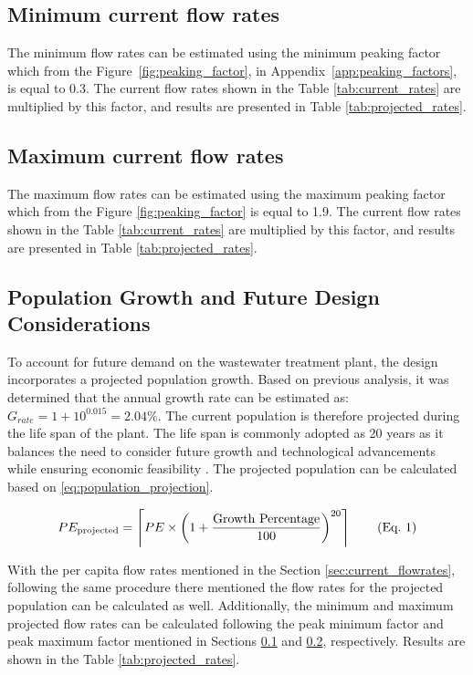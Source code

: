 \documentclass[11pt]{article}
\begin{document}
\subsection{Minimum current flow rates}
\label{sec:minimum_current_flowrates}

The minimum flow rates can be estimated using the minimum peaking factor
which from the Figure~\ref{fig:peaking_factor}, in Appendix~\ref{app:peaking_factors},
 is equal to 0.3. The current flow rates shown in the Table \ref{tab:current_rates}
are multiplied by this factor, and results are presented in Table \ref{tab:projected_rates}.


\subsection{Maximum current flow rates}
\label{sec:maximum_current_flowrates}

The maximum flow rates can be estimated using the maximum peaking factor
which from the Figure \ref{fig:peaking_factor} is equal to 1.9. The current flow rates shown in the Table \ref{tab:current_rates}
are multiplied by this factor, and results are presented in Table \ref{tab:projected_rates}.

\subsection{Population Growth and Future Design Considerations}

To account for future demand on the wastewater treatment plant, the design incorporates a projected population 
growth. Based on previous analysis, it was determined that 
the annual growth rate can be estimated as: \(G_{rate} = 1 + 10^{0.015} =2.04\%\).
The current population is therefore projected during the life span of the plant. The life span is 
commonly adopted as 20 years as it balances the need to consider future growth and 
technological advancements while ensuring economic feasibility \cite{wef_DesignWaterResource}.
The projected population can be calculated based on \eqref{eq:population_projection}. 


\begin{align}
  \refstepcounter{equation}
  PE_{\text{projected}} = \left\lceil PE \times \left(1 + \frac{\text{Growth Percentage}}{100} \right)^{20} \right\rceil 
  \tag{Eq.~\theequation} \label{eq:population_projection}
\end{align}

With the per capita flow rates mentioned in the Section \ref{sec:current_flowrates}, following the same procedure there mentioned
the flow rates for the projected population can be calculated as well. Additionally, the minimum and maximum projected flow rates
can be calculated following the peak minimum factor and peak maximum factor mentioned in Sections \ref{sec:minimum_current_flowrates}
and \ref{sec:maximum_current_flowrates}, respectively. Results are shown in the Table \ref{tab:projected_rates}.\\
\end{document}
